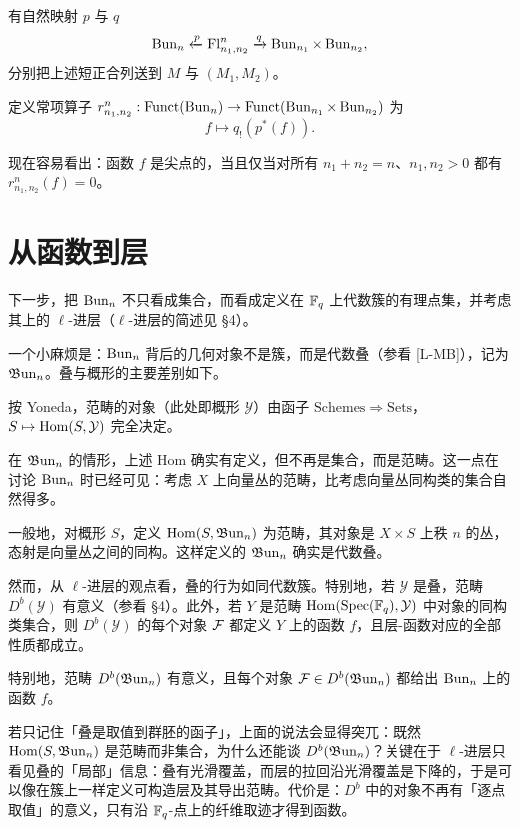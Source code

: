 有自然映射 $p$ 与 $q$
\[
\operatorname{Bun}_n\xleftarrow{p}\mathrm{Fl}^n_{n_1,n_2}\xrightarrow{q}\operatorname{Bun}_{n_1}\times\operatorname{Bun}_{n_2},
\]
分别把上述短正合列送到 $M$ 与 $(M_1,M_2)$。

定义常项算子 $r^n_{n_1,n_2}:\operatorname{Funct}(\operatorname{Bun}_n)\to\operatorname{Funct}(\operatorname{Bun}_{n_1}\times\operatorname{Bun}_{n_2})$ 为
\[
f\mapsto q_!(p^*(f)).
\]

现在容易看出：函数 $f$ 是尖点的，当且仅当对所有 $n_1+n_2=n$、$n_1,n_2>0$ 都有 \mbox{$r^n_{n_1,n_2}(f)=0$}。

\section{从函数到层}

下一步，把 $\operatorname{Bun}_n$ 不只看成集合，而看成定义在 $\mathbb{F}_q$ 上代数簇的有理点集，并考虑其上的 $\ell$-进层（$\ell$-进层的简述见 \S4）。

一个小麻烦是：$\operatorname{Bun}_n$ 背后的几何对象不是簇，而是代数叠（参看 [L-MB]），记为 $\mathfrak{B}\mathrm{un}_n$。叠与概形的主要差别如下。

按 Yoneda，范畴的对象（此处即概形 $\mathcal{Y}$）由函子 $\mathrm{Schemes}\Rightarrow\mathrm{Sets}$，$S\mapsto\operatorname{Hom}(S,\mathcal{Y})$ 完全决定。

在 $\mathfrak{B}\mathrm{un}_n$ 的情形，上述 Hom 确实有定义，但不再是集合，而是范畴。这一点在讨论 $\operatorname{Bun}_n$ 时已经可见：考虑 $X$ 上向量丛的范畴，比考虑向量丛同构类的集合自然得多。

一般地，对概形 $S$，定义 $\operatorname{Hom}(S,\mathfrak{B}\mathrm{un}_n)$ 为范畴，其对象是 $X\times S$ 上秩 $n$ 的丛，态射是向量丛之间的同构。这样定义的 $\mathfrak{B}\mathrm{un}_n$ 确实是代数叠。

然而，从 $\ell$-进层的观点看，叠的行为如同代数簇。特别地，若 $\mathcal{Y}$ 是叠，范畴 $D^b(\mathcal{Y})$ 有意义（参看 \S4）。此外，若 $Y$ 是范畴 $\operatorname{Hom}(\operatorname{Spec}(\mathbb{F}_q),\mathcal{Y})$ 中对象的同构类集合，则 $D^b(\mathcal{Y})$ 的每个对象 $\mathcal{F}$ 都定义 $Y$ 上的函数 $f$，且层-函数对应的全部性质都成立。

特别地，范畴 $D^b(\mathfrak{B}\mathrm{un}_n)$ 有意义，且每个对象 $\mathcal{F}\in D^b(\mathfrak{B}\mathrm{un}_n)$ 都给出 $\operatorname{Bun}_n$ 上的函数 $f$。

\begin{annote}
若只记住「叠是取值到群胚的函子」，上面的说法会显得突兀：既然 $\operatorname{Hom}(S,\mathfrak{B}\mathrm{un}_n)$ 是范畴而非集合，为什么还能谈 $D^b(\mathfrak{B}\mathrm{un}_n)$？关键在于 $\ell$-进层只看见叠的「局部」信息：叠有光滑覆盖，而层的拉回沿光滑覆盖是下降的，于是可以像在簇上一样定义可构造层及其导出范畴。代价是：$D^b$ 中的对象不再有「逐点取值」的意义，只有沿 $\mathbb{F}_q$-点上的纤维取迹才得到函数。\par{}
\end{annote}

